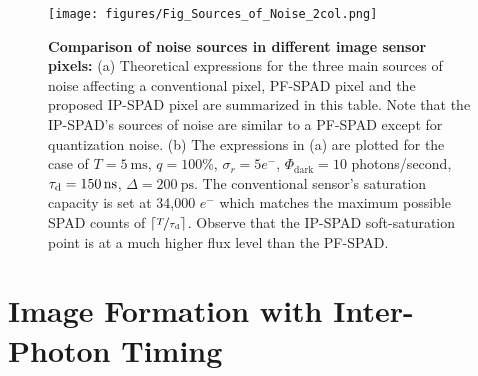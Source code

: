 \begin{figure*}[!t]
  \centering \texttt{[image: figures/Fig\_Sources\_of\_Noise\_2col.png]}
  \caption{\textbf{Comparison of noise sources in different image sensor pixels:}
	(a) Theoretical expressions for the three main sources of noise affecting a
conventional pixel, PF-SPAD pixel \cite{ingle2019high} and the proposed IP-SPAD
pixel are summarized in this table. Note that the IP-SPAD's sources of noise are similar
to a PF-SPAD except for quantization noise. (b) The expressions in (a) are plotted for
the case of $T=\SI{5}{\ms}$, $q=100\%$, $\sigma_r=5 e^-$, $\Phi_\text{dark}=10$ photons/second,
$\taud = \SI{150}{\ns}$, $\Delta=\SI{200}{\ps}$. The conventional sensor's saturation capacity
is set at 34,000 $e^-$ which matches the maximum possible SPAD counts of
$\lceil \nicefrac{T}{\tau_\text{d}} \rceil$.
Observe that the IP-SPAD soft-saturation point is at a much higher flux level
than the PF-SPAD. \label{fig:sources_of_noise}}
\end{figure*}


\section{Image Formation with Inter-Photon Timing}
